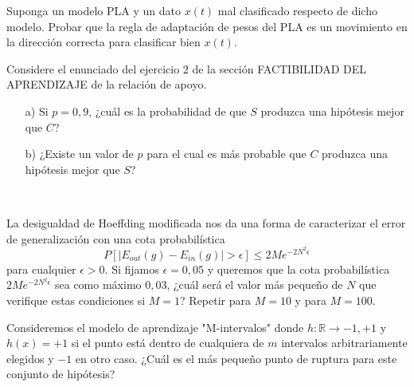 \documentclass[12pt]{article}
\theoremstyle{definition}
\begin{document}
\begin{pregunta}
Suponga un modelo PLA y un dato $x(t)$ mal clasificado respecto de dicho modelo. Probar que la regla de adaptación de pesos del PLA es un movimiento en la dirección correcta para clasificar bien $x(t)$.\\

\end{pregunta}

\begin{pregunta}
Considere el enunciado del ejercicio 2 de la sección FACTIBILIDAD DEL APRENDIZAJE de la relación de apoyo.
\begin{enumerate}
\item[a)] Si $p=0,9$, ¿cuál es la probabilidad de que $S$ produzca una hipótesis mejor que $C$?
\item[b)] ¿Existe un valor de $p$ para el cual es más probable que $C$ produzca una hipótesis mejor que $S$?
\end{enumerate}
\textit{ }\\


\end{pregunta}

\begin{pregunta}
La desigualdad de Hoeffding modificada nos da una forma de caracterizar el error de generalización con una cota probabilística
\begin{equation}
P[|E_{out}(g) - E_{in}(g)| > \epsilon] \leqslant 2Me^{-2N^2 \epsilon}
\end{equation}
para cualquier $\epsilon > 0$. Si fijamos $\epsilon=0,05$ y queremos que la cota probabilística $2Me^{-2N^2 \epsilon}$ sea como máximo $0,03$, ¿cuál será el valor más pequeño de $N$ que verifique estas condiciones si $M=1$? Repetir para $M=10$ y para $M=100$.\\

\end{pregunta}

\begin{pregunta}
Consideremos el modelo de aprendizaje "M-intervalos" \textit{ }donde $h: \mathbb{R} \rightarrow {-1, +1}$ y $h(x)=+1$ si el punto está dentro de cualquiera de $m$ intervalos arbitrariamente elegidos y $-1$ en otro caso. ¿Cuál es el más pequeño punto de ruptura para este conjunto de hipótesis?\\


\end{pregunta}
\end{document}
